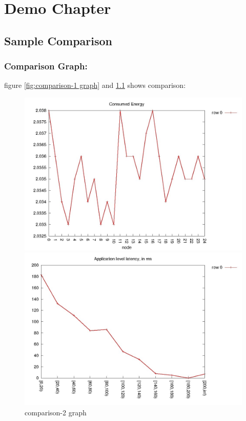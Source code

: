 \chapter{Demo Chapter}

\section{Sample Comparison}

\subsection{Comparison Graph:}



figure \ref{fig:comparison-1 graph} and \ref{fig:comparison-2 graph} shows comparison:\cite{k3} \cite{k4}

\begin{figure}[h!]
					\centering

					\begin{minipage}[b]{0.45\linewidth}
					\includegraphics[scale=0.4]{demo1}
					\caption{comparison-1 graph }	
					\label{fig:comparison-1 graph}				
					\end{minipage}
					\quad
					\begin{minipage}[b]{0.45\linewidth}
					\includegraphics[scale=0.4]{demo2}
					\caption{comparison-2 graph}
					\label{fig:comparison-2 graph}
					\end{minipage}
               
      
 \end{figure}